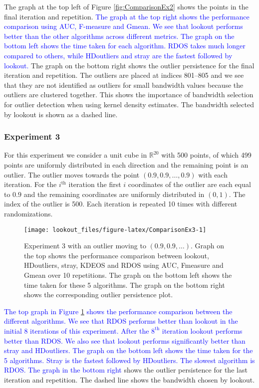 \documentclass[
]{article}
\begin{document}
The graph at the top left of Figure \ref{fig:ComparisonEx2} shows the
points in the final iteration and repetition.
\textcolor{blue}{ The graph at the top right shows the performance comparison using AUC, F-measure and Gmean. We see that lookout performs better than the other algorithms across different metrics. The graph on the bottom left shows the time taken for each algorithm. RDOS takes much longer compared to others, while HDoutliers and stray are the fastest followed by lookout.}
The graph on the bottom right shows the outlier persistence for the
final iteration and repetition. The outliers are placed at indices
801--805 and we see that they are not identified as outliers for small
bandwidth values because the outliers are clustered together. This shows
the importance of bandwidth selection for outlier detection when using
kernel density estimates. The bandwidth selected by lookout is shown as
a dashed line.

\hypertarget{experiment-3}{%
\subsubsection*{Experiment 3}\label{experiment-3}}

For this experiment we consider a unit cube in \(\mathbb{R}^{20}\) with
500 points, of which 499 points are uniformly distributed in each
direction and the remaining point is an outlier. The outlier moves
towards the point \(\left( 0.9, 0.9, \dots, 0.9 \right)\) with each
iteration. For the \(i^{\text{th}}\) iteration the first \(i\)
coordinates of the outlier are each equal to \(0.9\) and the remaining
coordinates are uniformly distributed in \((0,1)\). The index of the
outlier is 500. Each iteration is repeated 10 times with different
randomizations.

\begin{figure}
\texttt{[image: lookout\_files/figure-latex/ComparisonEx3-1]} \caption{Experiment 3 with an outlier moving to $(0.9, 0.9, \dots)$. Graph on the top shows the performance comparison between lookout, HDoutliers, stray, KDEOS and RDOS using AUC, Fmeasure and Gmean over 10 repetitions. The graph on the bottom left shows the time taken for these 5 algorithms. The graph on the bottom right shows the corresponding outlier persistence plot.}\label{fig:ComparisonEx3}
\end{figure}

\textcolor{blue}{The top graph in Figure \ref{fig:ComparisonEx3} shows the performance comparison between the different algorithms. We see that RDOS performs better than lookout in the initial 8 iterations of this experiment. After the $8^{\text{th}}$ iteration lookout performs better than RDOS. We also see that lookout performs significantly better than stray and HDoutliers. The graph on the bottom left shows the time taken for the 5 algorithms. Stray is the fastest followed by HDoutliers. The slowest algorithm is RDOS. The graph in the bottom right }
shows the outlier persistence for the last iteration and repetition. The
dashed line shows the bandwidth chosen by lookout.
\end{document}
